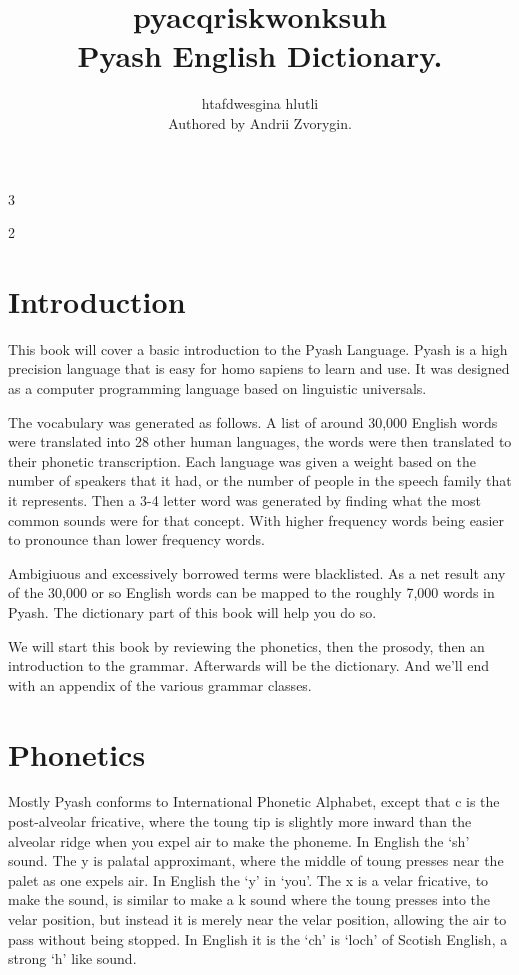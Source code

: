 \documentclass[10pt,pagesize]{article}
\title{pyacqriskwonksuh \\ Pyash English Dictionary.}
\author{htafdwesgina hlutli \\ Authored by Andrii Zvorygin.}
\date{\date}
\begin{document}
\maketitle
\begin{multicols}{3}
\scriptsize
\tableofcontents
\end{multicols}
\begin{multicols}{2}
\scriptsize
\section{Introduction}
This book will cover a basic introduction to the Pyash Language. Pyash is a high
precision language that is easy for homo sapiens to learn and use. 
It was designed as a computer programming language based on linguistic 
  universals.

The vocabulary was generated as follows. A list of around 30,000 English words
were translated into 28 other human languages, the words were then translated to
their phonetic transcription. Each language was given a weight based on the
  number of speakers that it had, or the number of people in the  speech family 
  that it represents.   Then a 3-4 letter word was generated by finding what the most common sounds
  were for that concept. With higher frequency words being easier to pronounce
  than lower frequency words. 

Ambigiuous and excessively borrowed terms were
  blacklisted.  As a net result any of the 30,000 or so English words
  can be mapped to the roughly 7,000 words in Pyash. The dictionary part of this
  book will help you do so.

We will start this book by reviewing the phonetics, then the prosody, then an
  introduction to the grammar. Afterwards will be the dictionary. And we'll end with an
  appendix of the various grammar classes. 


\section{Phonetics}
Mostly Pyash conforms to International Phonetic Alphabet,
except that c is the post-alveolar fricative, where the toung tip is slightly
  more inward than the alveolar ridge when you expel air to make the phoneme.
  In English the `sh' sound. 
The y is palatal approximant, where the middle of toung presses near the palet
  as one expels air. In English the `y' in `you'. The x is a velar fricative, to
  make the sound, is similar to make a k sound where the toung presses into the
  velar position, but instead it is merely near the velar position, allowing the
  air to pass without being stopped. In English
  it is the `ch' is `loch' of Scotish English, a strong `h' like sound. 


\end{multicols}
\end{document}
